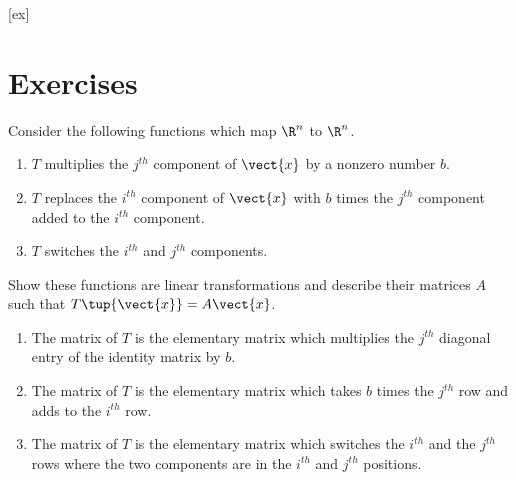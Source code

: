 [ex]
\section*{Exercises}

\begin{enumialphparenastyle}

\begin{ex} \label{exer-linear-transf}
Consider the following functions which map $\R^{n}$ to $\R^{n}$. 

\begin{enumerate}
\item $T$ multiplies the $j^{th}$ component of $\vect{x}$ by a nonzero
number $b.$

\item $T$ replaces the $i^{th}$ component of $\vect{x}$ with $b$ times the
$j^{th}$ component added to the $i^{th}$ component.

\item $T$ switches the $i^{th}$ and $j^{th}$ components.
\end{enumerate}

Show these functions are linear transformations and describe their matrices $A$ such that $T\tup{\vect{x}} = A\vect{x}$.
\begin{sol}
\begin{enumerate}
\item The matrix of $T$ is the elementary matrix which multiplies
the $j^{th}$ diagonal entry of the identity matrix by $b$.
\item The matrix of $T$ is the
elementary matrix which takes $b$ times the $j^{th}$ row and adds to the $%
i^{th}$ row.
\item The matrix of $T$ is the elementary matrix which switches the $%
i^{th}$ and the $j^{th}$ rows where the two components are in the $i^{th}$
and $j^{th}$ positions.
\end{enumerate}
\end{sol}
\end{ex}


\end{enumialphparenastyle}
